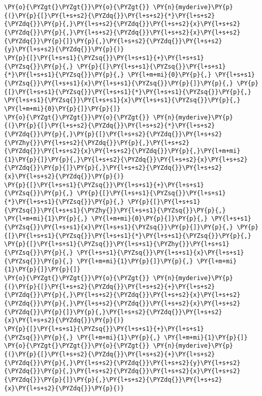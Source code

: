 \begin{Verbatim}[commandchars=\\\{\}]
\PY{o}{\PYZgt{}\PYZgt{}}\PY{o}{\PYZgt{}} \PY{n}{myderive}\PY{p}{(}\PY{p}{[}\PY{l+s+s2}{\PYZdq{}}\PY{l+s+s2}{*}\PY{l+s+s2}{\PYZdq{}}\PY{p}{,}\PY{l+s+s2}{\PYZdq{}}\PY{l+s+s2}{x}\PY{l+s+s2}{\PYZdq{}}\PY{p}{,}\PY{l+s+s2}{\PYZdq{}}\PY{l+s+s2}{x}\PY{l+s+s2}{\PYZdq{}}\PY{p}{]}\PY{p}{,}\PY{l+s+s2}{\PYZdq{}}\PY{l+s+s2}{y}\PY{l+s+s2}{\PYZdq{}}\PY{p}{)}
\PY{p}{[}\PY{l+s+s1}{\PYZsq{}}\PY{l+s+s1}{+}\PY{l+s+s1}{\PYZsq{}}\PY{p}{,} \PY{p}{[}\PY{l+s+s1}{\PYZsq{}}\PY{l+s+s1}{*}\PY{l+s+s1}{\PYZsq{}}\PY{p}{,} \PY{l+m+mi}{0}\PY{p}{,} \PY{l+s+s1}{\PYZsq{}}\PY{l+s+s1}{x}\PY{l+s+s1}{\PYZsq{}}\PY{p}{]}\PY{p}{,} \PY{p}{[}\PY{l+s+s1}{\PYZsq{}}\PY{l+s+s1}{*}\PY{l+s+s1}{\PYZsq{}}\PY{p}{,} \PY{l+s+s1}{\PYZsq{}}\PY{l+s+s1}{x}\PY{l+s+s1}{\PYZsq{}}\PY{p}{,} \PY{l+m+mi}{0}\PY{p}{]}\PY{p}{]}
\PY{o}{\PYZgt{}\PYZgt{}}\PY{o}{\PYZgt{}} \PY{n}{myderive}\PY{p}{(}\PY{p}{[}\PY{l+s+s2}{\PYZdq{}}\PY{l+s+s2}{*}\PY{l+s+s2}{\PYZdq{}}\PY{p}{,}\PY{p}{[}\PY{l+s+s2}{\PYZdq{}}\PY{l+s+s2}{\PYZhy{}}\PY{l+s+s2}{\PYZdq{}}\PY{p}{,}\PY{l+s+s2}{\PYZdq{}}\PY{l+s+s2}{x}\PY{l+s+s2}{\PYZdq{}}\PY{p}{,}\PY{l+m+mi}{1}\PY{p}{]}\PY{p}{,}\PY{l+s+s2}{\PYZdq{}}\PY{l+s+s2}{x}\PY{l+s+s2}{\PYZdq{}}\PY{p}{]}\PY{p}{,}\PY{l+s+s2}{\PYZdq{}}\PY{l+s+s2}{x}\PY{l+s+s2}{\PYZdq{}}\PY{p}{)}
\PY{p}{[}\PY{l+s+s1}{\PYZsq{}}\PY{l+s+s1}{+}\PY{l+s+s1}{\PYZsq{}}\PY{p}{,} \PY{p}{[}\PY{l+s+s1}{\PYZsq{}}\PY{l+s+s1}{*}\PY{l+s+s1}{\PYZsq{}}\PY{p}{,} \PY{p}{[}\PY{l+s+s1}{\PYZsq{}}\PY{l+s+s1}{\PYZhy{}}\PY{l+s+s1}{\PYZsq{}}\PY{p}{,} \PY{l+m+mi}{1}\PY{p}{,} \PY{l+m+mi}{0}\PY{p}{]}\PY{p}{,} \PY{l+s+s1}{\PYZsq{}}\PY{l+s+s1}{x}\PY{l+s+s1}{\PYZsq{}}\PY{p}{]}\PY{p}{,} \PY{p}{[}\PY{l+s+s1}{\PYZsq{}}\PY{l+s+s1}{*}\PY{l+s+s1}{\PYZsq{}}\PY{p}{,} \PY{p}{[}\PY{l+s+s1}{\PYZsq{}}\PY{l+s+s1}{\PYZhy{}}\PY{l+s+s1}{\PYZsq{}}\PY{p}{,} \PY{l+s+s1}{\PYZsq{}}\PY{l+s+s1}{x}\PY{l+s+s1}{\PYZsq{}}\PY{p}{,} \PY{l+m+mi}{1}\PY{p}{]}\PY{p}{,} \PY{l+m+mi}{1}\PY{p}{]}\PY{p}{]}
\PY{o}{\PYZgt{}\PYZgt{}}\PY{o}{\PYZgt{}} \PY{n}{myderive}\PY{p}{(}\PY{p}{[}\PY{l+s+s2}{\PYZdq{}}\PY{l+s+s2}{+}\PY{l+s+s2}{\PYZdq{}}\PY{p}{,}\PY{l+s+s2}{\PYZdq{}}\PY{l+s+s2}{x}\PY{l+s+s2}{\PYZdq{}}\PY{p}{,}\PY{l+s+s2}{\PYZdq{}}\PY{l+s+s2}{x}\PY{l+s+s2}{\PYZdq{}}\PY{p}{]}\PY{p}{,}\PY{l+s+s2}{\PYZdq{}}\PY{l+s+s2}{x}\PY{l+s+s2}{\PYZdq{}}\PY{p}{)}
\PY{p}{[}\PY{l+s+s1}{\PYZsq{}}\PY{l+s+s1}{+}\PY{l+s+s1}{\PYZsq{}}\PY{p}{,} \PY{l+m+mi}{1}\PY{p}{,} \PY{l+m+mi}{1}\PY{p}{]}
\PY{o}{\PYZgt{}\PYZgt{}}\PY{o}{\PYZgt{}} \PY{n}{myderive}\PY{p}{(}\PY{p}{[}\PY{l+s+s2}{\PYZdq{}}\PY{l+s+s2}{+}\PY{l+s+s2}{\PYZdq{}}\PY{p}{,}\PY{l+s+s2}{\PYZdq{}}\PY{l+s+s2}{y}\PY{l+s+s2}{\PYZdq{}}\PY{p}{,}\PY{l+s+s2}{\PYZdq{}}\PY{l+s+s2}{x}\PY{l+s+s2}{\PYZdq{}}\PY{p}{]}\PY{p}{,}\PY{l+s+s2}{\PYZdq{}}\PY{l+s+s2}{x}\PY{l+s+s2}{\PYZdq{}}\PY{p}{)}

\end{Verbatim}
